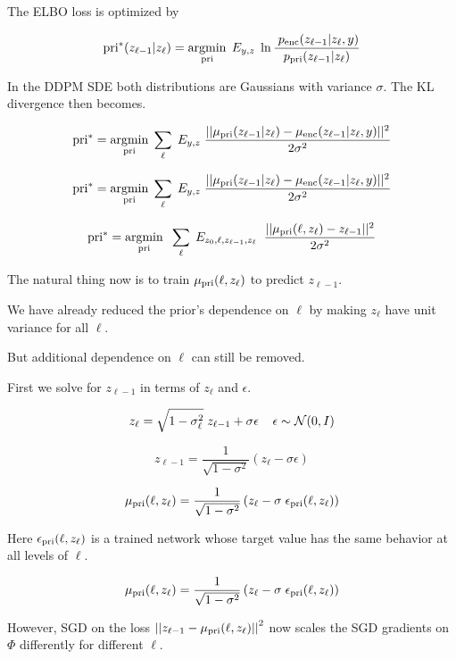 {

The ELBO loss is optimized by

$$\mathrm{pri}^*(z_{\ell-1}|z_\ell)  = \operatorname*{argmin}_{\mathrm{pri}}\;E_{y,z}\;\ln  \frac{\;p_{\mathrm{enc}}(z_{\ell-1}|z_\ell,y)}{p_{\mathrm{pri}}(z_{\ell-1}|z_\ell)}$$

In the DDPM SDE both distributions are Gaussians with variance $\sigma$.  The KL divergence then becomes.

$$\mathrm{pri}^* = \operatorname*{argmin}_{\mathrm{pri}} \;\sum_\ell \;E_{y,z}\;\frac{||\mu_{\mathrm{pri}}(z_{\ell-1}|z_\ell) - \mu_{\mathrm{enc}}(z_{\ell-1}|z_\ell,y)||^2}{2\sigma^2}$$


$$\mathrm{pri}^* = \operatorname*{argmin}_{\mathrm{pri}} \;\sum_\ell \;E_{y,z}\;\frac{||\mu_{\mathrm{pri}}(z_{\ell-1}|z_\ell) - \mu_{\mathrm{enc}}(z_{\ell-1}|z_\ell,y)||^2}{2\sigma^2}$$

$$\mathrm{pri}^* = \operatorname*{argmin}_{\mathrm{pri}}\;\;\sum_\ell\;E_{z_0,\ell,z_{\ell-1},z_\ell} \;\;\frac{||\mu_{\mathrm{pri}}(\ell,z_\ell) - z_{\ell-1}||^2}{2\sigma^2}$$

\vfill
The natural thing now is to train $\mu_{\mathrm{pri}}(\ell,z_\ell)$ to predict $z_{\ell-1}$.


We have already reduced the prior's dependence on $\ell$ by making $z_\ell$ have unit variance for all $\ell$.

\vfill
But additional dependence on $\ell$ can still be removed.

\vfill
First we solve for $z_{\ell-1}$ in terms of $z_\ell$ and $\epsilon$.

{\huge
$$z_\ell = \sqrt{1-\sigma^2_\ell}\;z_{\ell-1} + \sigma \epsilon\;\;\;\;\epsilon \sim {\cal N}(0,I)$$

\vfill
$$z_{\ell-1} = \frac{1}{\sqrt{1-\sigma^2}}(z_\ell - \sigma \epsilon)$$

\vfill
$$\mu_{\mathrm{pri}}(\ell,z_\ell) = \frac{1}{\sqrt{1-\sigma^2}}\left(z_\ell - \sigma\; \epsilon_{\mathrm{pri}}(\ell,z_\ell)\right)$$
}

\vfill
Here $\epsilon_{\mathrm{pri}}(\ell,z_\ell)$ is a trained network whose target value has the same behavior at all levels of $\ell$.


$$\mu_{\mathrm{pri}}(\ell,z_\ell) = \frac{1}{\sqrt{1-\sigma^2}}\left(z_\ell - \sigma\; \epsilon_{\mathrm{pri}}(\ell,z_\ell)\right)$$

\vfill
However, SGD on the loss $\left|\left|z_{\ell-1} - \mu_{\mathrm{pri}}(\ell,z_\ell)\right|\right|^2$ now scales the SGD gradients on $\Phi$ differently for different $\ell$.

}
